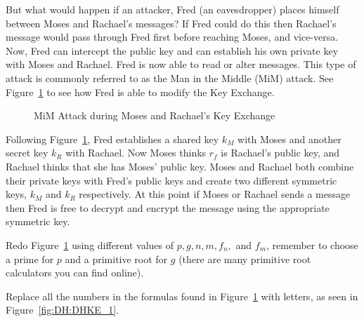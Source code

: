 But what would happen if an attacker, Fred (an eavesdropper) places himself between Moses and Rachael's messages?  If Fred could do this then Rachael's message would pass through Fred first before reaching Moses, and vice-versa. Now, Fred can intercept the public key and can establish his own private key with Moses and Rachael.  Fred is now able to read or alter messages.  This type of attack is commonly referred to as the Man in the Middle (MiM) attack.  See Figure~\ref{fig:DH:DHKE_2} to see how Fred is able to modify the Key Exchange.
\begin{figure}[H]
	  \caption{\label{fig:DH:DHKE_2} MiM Attack during Moses and Rachael's Key Exchange }
\end{figure}

Following Figure~\ref{fig:DH:DHKE_2}, Fred establishes a shared key $k_M$ with Moses and another secret key $k_R$ with Rachael.  Now Moses thinks $r_f$ is Rachael's public key, and Rachael thinks that she has Moses' public key. Moses and Rachael both combine their private keys with Fred's public keys and create two different symmetric keys, $k_M$ and $k_R$ respectively. At this point if Moses or Rachael sends a message then Fred is free to decrypt and encrypt the message using the appropriate symmetric key. 

\begin{exercise}{}
Redo Figure~\ref{fig:DH:DHKE_2} using different values of $p, g, n,m, f_n,$ and $f_m$, remember to choose a prime for $p$ and a primitive root for $g$ (there are many primitive root calculators you can find online).
\end{exercise}

\begin{exercise}{}
Replace all the numbers in the formulas found in Figure~\ref{fig:DH:DHKE_2} with letters, as seen in Figure~\ref{fig:DH:DHKE_1}.
\end{exercise}

